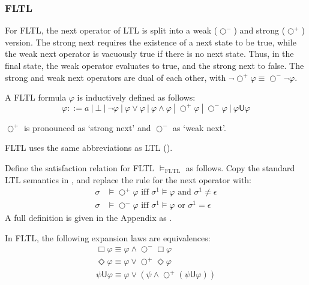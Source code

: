 \documentclass[a4paper]{article}
\newcommand{\U}{\mathsf{U}}
\newcommand{\tand}{\text{ and }}
\newcommand{\tor}{\text{ or }}
\newcommand{\tiff}{\text{ iff }}
\newcommand{\sn}{\bigcirc^+}
\newcommand{\wn}{\bigcirc^-}
\begin{document}
\subsubsection{FLTL} For FLTL, the next operator of LTL is split into a weak ($\wn$) and strong ($\sn$) version.
The strong next requires the existence of a next state to be true, while the weak next operator is vacuously true if there is no next state.
Thus, in the final state, the weak operator evaluates to true, and the strong next to false. The strong and weak next operators are dual of each other, with  $\neg\sn\varphi \equiv \wn\neg\varphi$.

\begin{defn}\label{fltlsyn}

  A FLTL formula $\varphi$ is inductively defined as follows:
  \[\varphi ::= a ~|~ \bot ~|~ \neg \varphi ~|~\varphi \lor \varphi ~|~ \varphi \land \varphi ~|~ \sn \varphi ~|~ \wn \varphi ~|~ \varphi \U\varphi\]

  $\sn$ is pronounced as `strong next' and $\wn$ as `weak next'.
\end{defn}

  FLTL uses the same abbreviations as LTL ().

\begin{defn}\label{fltlsem}

  Define the satisfaction relation for FLTL $\vDash_{\text{FLTL}}$ as follows.
  Copy the standard LTL semantics in , and replace the rule for the next operator with:
  \begin{align*}
    \sigma&\vDash\sn\varphi \tiff \sigma^1\vDash\varphi \tand \sigma^1 \neq \epsilon\\
    \sigma&\vDash\wn\varphi \tiff \sigma^1\vDash\varphi \tor \sigma^1 = \epsilon
  \end{align*}
  A full definition is given in the Appendix as .
\end{defn}


\begin{lem}\label{fltlexp}

  In FLTL, the following expansion laws are equivalences:
  \begin{align}
    \Box \varphi \equiv \varphi \land \wn \Box \varphi \label{felBox}\\
    \Diamond \varphi \equiv \varphi \lor \sn \Diamond \varphi\label{felDiamond}\\
    \psi \U \varphi \equiv \varphi \lor (\psi \land \sn (\psi \U \varphi))\label{felU}
  \end{align}

\end{lem}
\end{document}
